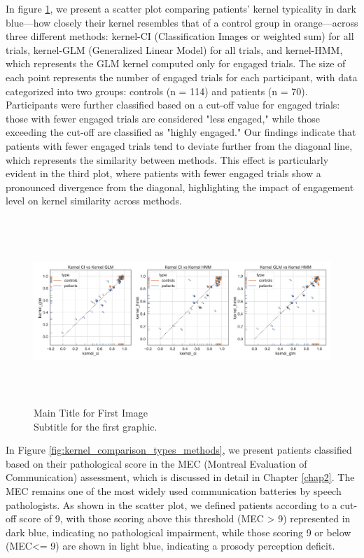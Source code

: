 In figure \ref{fig:kernel_comparison_methods}, we present a scatter plot comparing patients' kernel typicality in dark blue—how closely their kernel resembles that of a control group in orange—across three different methods: kernel-CI (Classification Images or weighted sum) for all trials, kernel-GLM (Generalized Linear Model) for all trials, and kernel-HMM, which represents the GLM kernel computed only for engaged trials.
The size of each point represents the number of engaged trials for each participant, with data categorized into two groups: controls (n = 114) and patients (n = 70). Participants were further classified based on a cut-off value for engaged trials: those with fewer engaged trials are considered "less engaged," while those exceeding the cut-off are classified as "highly engaged."
Our findings indicate that patients with fewer engaged trials tend to deviate further from the diagonal line, which represents the similarity between methods. This effect is particularly evident in the third plot, where patients with fewer engaged trials show a pronounced divergence from the diagonal, highlighting the impact of engagement level on kernel similarity across methods.

\begin{figure}[H]
    \centering
    \includegraphics[width=17cm,height=7cm]{MainLayout/Images/chapter8/kernel_comparison_methods.jpg}
    \caption{Main Title for First Image \\ \small Subtitle for the first graphic.}
    \label{fig:kernel_comparison_methods}
\end{figure}
In Figure \ref{fig:kernel_comparison_types_methods}, we present patients classified based on their pathological score in the MEC (Montreal Evaluation of Communication) assessment, which is discussed in detail in Chapter \ref{chap2}. The MEC remains one of the most widely used communication batteries by speech pathologists. As shown in the scatter plot, we defined patients according to a cut-off score of 9, with those scoring above this threshold (MEC > 9) represented in dark blue, indicating no pathological impairment, while those scoring 9 or below (MEC<= 9) are shown in light blue, indicating a prosody perception deficit.

